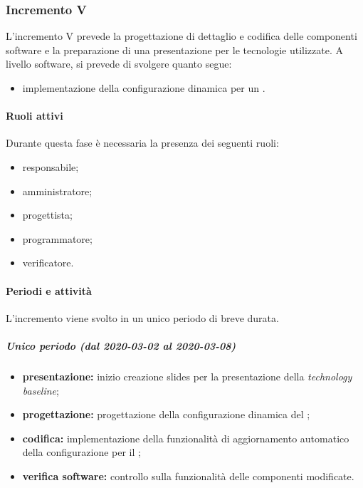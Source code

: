 		\subsubsection{Incremento V}
			
			L'incremento V prevede la progettazione di dettaglio e codifica delle componenti software e la preparazione di una presentazione per le tecnologie utilizzate. A livello software, si prevede di svolgere quanto segue:
			\begin{itemize}
				\item implementazione della configurazione dinamica per un .
			\end{itemize}
			
			\paragraph{Ruoli attivi}
			
				Durante questa fase è necessaria la presenza dei seguenti ruoli:
				\begin{itemize}
					\item responsabile;
					\item amministratore;
					\item progettista;
					\item programmatore;
					\item verificatore.
				\end{itemize}
			
			\paragraph{Periodi e attività}
			
				L'incremento viene svolto in un unico periodo di breve durata.
				
				\subparagraph{Unico periodo (dal 2020-03-02 al 2020-03-08)}
				
					\begin{itemize}
						\item \textbf{presentazione:} inizio creazione slides per la presentazione della \textit{technology baseline};
						\item \textbf{progettazione:} progettazione della configurazione dinamica del ;
						\item \textbf{codifica:} implementazione della funzionalità di aggiornamento automatico della configurazione per il ;
						\item \textbf{verifica software:} controllo sulla funzionalità delle componenti modificate.
					\end{itemize} 			

